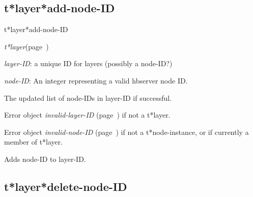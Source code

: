 \subsection{t*layer*add-node-ID}
\label{t*layer*add-node-ID}

\begin{description}
\item [Name:]  t*layer*add-node-ID

\item [Class:] {\sl t*layer}\hfill(page~\pageref{t*layer})

\item [Parameters:]
\item {\sl layer-ID}:  a unique ID for layers (possibly a node-ID?)


\item {\sl node-ID}:   An integer representing
a valid hbserver node ID.


\item [Return-value:]
The updated list of node-IDs in layer-ID if successful.

Error object {\sl invalid-layer-ID} (page~\pageref{invalid-layer-ID}) if not a t*layer.

Error object {\sl invalid-node-ID} (page~\pageref{invalid-node-ID}) if not a 
t*node-instance, or if currently a member of t*layer.

\item [Description:]

Adds node-ID to layer-ID.

\item [Public:]



\end{description}
\horizontalline

\subsection{t*layer*delete-node-ID}
\label{t*layer*delete-node-ID}

